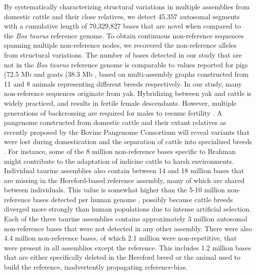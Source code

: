 \documentclass[../main.tex]{subfiles}
\begin{document}
By systematically characterizing structural variations in multiple assemblies from domestic cattle and their close relatives, we detect 45,357 autosomal segments with a cumulative length of 70,329,827 bases that are novel when compared to the \emph{Bos taurus} reference genome. To obtain continuous non-reference sequences spanning multiple non-reference nodes, we recovered the non-reference alleles from structural variations. The number of bases detected in our study that are not in the \emph{Bos taurus }reference genome is comparable to values reported for pigs (72.5 Mb \citep{tian2019building} and goats (38.3 Mb \citep{li2019towards}, based on multi-assembly graphs constructed from 11 and 8 animals representing different breeds respectively. In our study, many non-reference sequences originate from yak. Hybridizing between yak and cattle is widely practiced, and results in fertile female descendants. However, multiple generations of backcrossing are required for males to resume fertility \citep{qi2010assessment}. A pangenome constructed from domestic cattle and their extant relatives as recently proposed by the Bovine Pangenome Consortium \citep{smith2020genome} will reveal variants that were lost during domestication and the separation of cattle into specialized breeds \citep{khan2020super}. For instance, some of the 8 million non-reference bases specific to Brahman might contribute to the adaptation of indicine cattle to harsh environments. Individual taurine assemblies also contain between 14 and 18 million bases that are missing in the Hereford-based reference assembly, many of which are shared between individuals. This value is somewhat higher than the 5-10 million non-reference bases detected per human genome \citep{ameur2018novo,audano2019characterizing,duan2019hupan}, possibly because cattle breeds diverged more strongly than human populations due to intense artificial selection. Each of the three taurine assemblies contains approximately 3 million autosomal non-reference bases that were not detected in any other assembly. There were also 4.4 million non-reference bases, of which 2.1 million were non-repetitive, that were present in all assemblies except the reference. This includes 1.2 million bases that are either specifically deleted in the Hereford breed or the animal used to build the reference, inadvertently propagating reference-bias.
\end{document}
